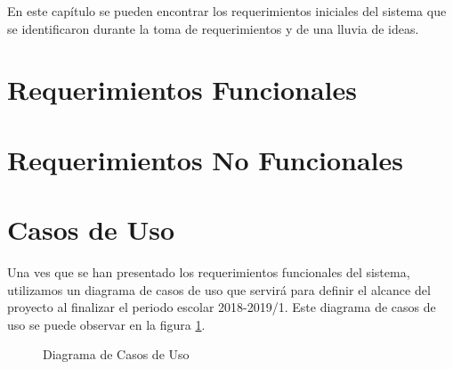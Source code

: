 En este capítulo se pueden encontrar los requerimientos iniciales del sistema que se identificaron durante la toma de requerimientos y de una lluvia de ideas.

\section{Requerimientos Funcionales}





\section{Requerimientos No Funcionales}


\section{Casos de Uso}
Una ves que se han presentado los requerimientos funcionales del sistema, utilizamos un diagrama de casos de uso que servirá para definir el alcance del proyecto al finalizar el periodo escolar 2018-2019/1. Este diagrama de casos de uso se puede observar en la figura \ref{fig:casosDeUso}.

\begin{figure}[hbtp!]
	\begin{center}
		\caption{Diagrama de Casos de Uso}
		\label{fig:casosDeUso}
	\end{center}
\end{figure}


